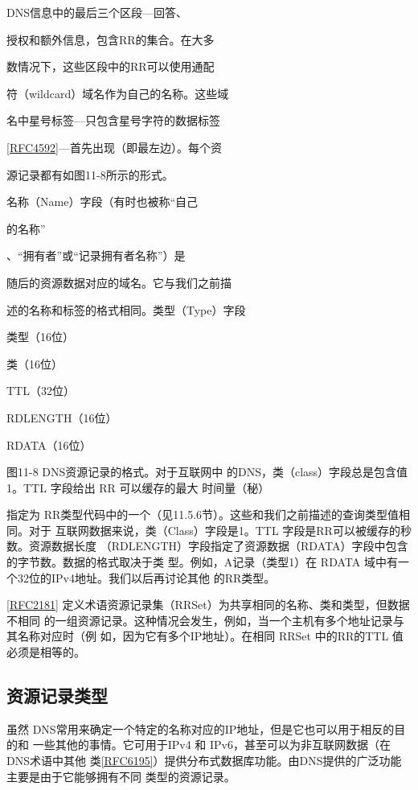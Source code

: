 DNS信息中的最后三个区段—回答、

授权和额外信息，包含RR的集合。在大多

数情况下，这些区段中的RR可以使用通配

符（wildcard）域名作为自己的名称。这些域

名中星号标签—只包含星号字符的数据标签

\href{https://www.rfc-editor.org/rfc/rfc4592}{[RFC4592]}—首先出现（即最左边）。每个资

源记录都有如图11-8所示的形式。

名称（Name）字段（有时也被称“自己

的名称”

、“拥有者”或“记录拥有者名称”）是

随后的资源数据对应的域名。它与我们之前描

述的名称和标签的格式相同。类型（Type）字段

类型（16位）

类（16位）

TTL（32位）

RDLENGTH（16位）

RDATA（16位）

图11-8 DNS资源记录的格式。对于互联网中
的DNS，类（class）字段总是包含值
1。TTL 字段给出 RR 可以缓存的最大
时间量（秘）

指定为 RR类型代码中的一个（见11.5.6节）。这些和我们之前描述的查询类型值相同。对于
互联网数据来说，类（Class）字段是1。TTL 字段是RR可以被缓存的秒数。资源数据长度
（RDLENGTH）字段指定了资源数据（RDATA）字段中包含的字节数。数据的格式取决于类
型。例如，A记录（类型1）在 RDATA 域中有一个32位的IPv4地址。我们以后再讨论其他
的RR类型。

\href{https://www.rfc-editor.org/rfc/rfc2181}{[RFC2181]} 定义术语资源记录集（RRSet）为共享相同的名称、类和类型，但数据不相同
的一组资源记录。这种情况会发生，例如，当一个主机有多个地址记录与其名称对应时（例
如，因为它有多个IP地址）。在相同 RRSet 中的RR的TTL 值必须是相等的。

\subsection{资源记录类型}

虽然 DNS常用来确定一个特定的名称对应的IP地址，但是它也可以用于相反的目的和
一些其他的事情。它可用于IPv4 和 IPv6，甚至可以为非互联网数据（在 DNS术语中其他
类\href{https://www.rfc-editor.org/rfc/rfc6195}{[RFC6195]}）提供分布式数据库功能。由DNS提供的广泛功能主要是由于它能够拥有不同
类型的资源记录。

